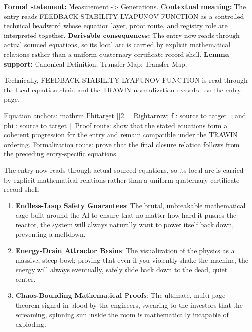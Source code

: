 \begingroup\footnotesize\setlength{\emergencystretch}{3em}\sloppy
\textbf{Formal statement:} Measurement -> Generations. \textbf{Contextual meaning:} The entry reads FEEDBACK STABILITY LYAPUNOV FUNCTION as a controlled technical headword whose equation layer, proof route, and registry role are interpreted together. \textbf{Derivable consequences:} The entry now reads through actual sourced equations, so its local arc is carried by explicit mathematical relations rather than a uniform quaternary certificate record shell. \textbf{Lemma support:} Canonical Definition; Transfer Map; Transfer Map.\par
\endgroup

Technically, FEEDBACK STABILITY LYAPUNOV FUNCTION is read through the local equation chain and the TRAWIN normalization recorded on the entry page.

Equation anchors: mathrm Phitarget ||2 = Rightarrow; f : source to target |; and phi : source to target |. Proof route: show that the stated equations form a coherent progression for the entry and remain compatible under the TRAWIN ordering. Formalization route: prove that the final closure relation follows from the preceding entry-specific equations.

The entry now reads through actual sourced equations, so its local arc is carried by explicit mathematical relations rather than a uniform quaternary certificate record shell.
\endgroup

\begin{enumerate}[leftmargin=1.6em,itemsep=6pt,topsep=4pt]
\item \textbf{Endless-Loop Safety Guarantees}: The brutal, unbreakable mathematical cage built around the AI to ensure that no matter how hard it pushes the reactor, the system will always naturally want to power itself back down, preventing a meltdown.
\item \textbf{Energy-Drain Attractor Basins}: The visualization of the physics as a massive, steep bowl; proving that even if you violently shake the machine, the energy will always eventually, safely slide back down to the dead, quiet center.
\item \textbf{Chaos-Bounding Mathematical Proofs}: The ultimate, multi-page theorem signed in blood by the engineers, swearing to the investors that the screaming, spinning sun inside the room is mathematically incapable of exploding.
\end{enumerate}

